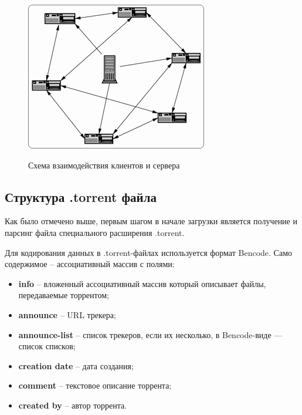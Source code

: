 \begin{figure}[h!]
	\begin{center}
		{\includegraphics[scale = 0.7]{img/torrent.png}}
		\caption{Схема взаимодействия клиентов и сервера}
		\label{fig100:image}
	\end{center}
\end{figure}

\subsection{Структура .torrent файла}
Как было отмечено выше, первым шагом в начале загрузки является получение и парсинг файла специального расширения .torrent.

Для кодирования данных в .torrent-файлах используется формат Bencode. Само содержимое -- ассоциативный массив с полями:
\begin{itemize}
	\item \textbf{info} -- вложенный ассоциативный массив который описывает файлы, передаваемые торрентом;
	
	\item \textbf{announce} -- URL трекера;
	
	\item \textbf{announce-list} -- список трекеров, если их несколько, в Bencode-виде — список списков;
	
	\item \textbf{creation date} -- дата создания;
	
	\item \textbf{comment} -- текстовое описание торрента;
	
	\item \textbf{created by} -- автор торрента. \\
\end{itemize}

